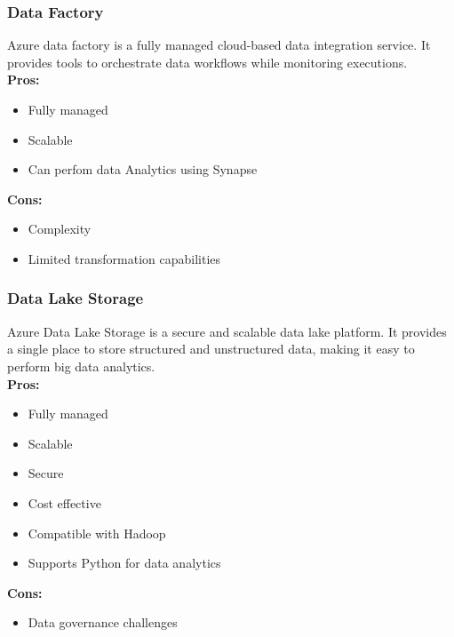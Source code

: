         \subsubsection{Data Factory}
        \label{azure:data-factory}
        Azure data factory is a fully managed cloud-based data integration service.
        It provides tools to orchestrate data workflows while monitoring executions.\\
        \textbf{Pros:}
        \begin{itemize}
            \item Fully managed
            \item Scalable
            \item Can perfom data Analytics using Synapse
        \end{itemize}
        \textbf{Cons:}
        \begin{itemize}
            \item Complexity
            \item Limited transformation capabilities
        \end{itemize}

        \subsubsection{Data Lake Storage}
        \label{azure:data-lake-storage}
        Azure Data Lake Storage is a secure and scalable data lake platform. It provides a single place to store structured and unstructured data, making it easy to perform big data analytics.\\
        \textbf{Pros:}
        \begin{itemize}
            \item Fully managed
            \item Scalable
            \item Secure
            \item Cost effective
            \item Compatible with Hadoop
            \item Supports Python for data analytics
        \end{itemize}
        \textbf{Cons:}
        \begin{itemize}
            \item Data governance challenges
        \end{itemize}

